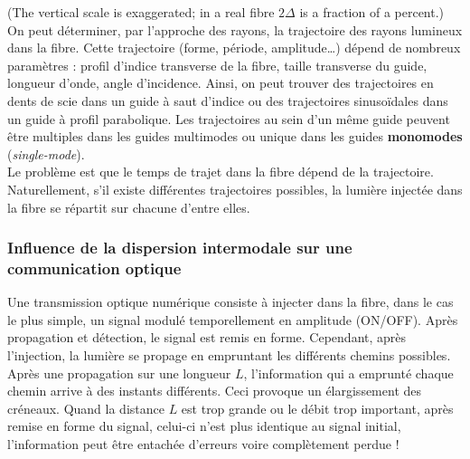 \begin{figure}[h!]
  \centering
\end{figure}

\noindent (The vertical scale is exaggerated; in a real fibre $2\Delta$ is a
fraction of a percent.) On peut déterminer, par l'approche des rayons, la
trajectoire des rayons lumineux dans la fibre. Cette trajectoire (forme,
période, amplitude…) dépend de nombreux paramètres : profil d'indice transverse
de la fibre, taille transverse du guide, longueur d'onde, angle d'incidence.
Ainsi, on peut trouver des trajectoires en dents de scie dans un guide à saut
d'indice ou des trajectoires sinusoïdales dans un guide à profil parabolique.
Les trajectoires au sein d'un même guide peuvent être multiples dans les guides
multimodes ou unique dans les guides \textbf{monomodes}
(\textit{single-mode}).\\

Le problème est que le temps de trajet dans la fibre dépend de la trajectoire.
Naturellement, s'il existe différentes trajectoires possibles, la lumière
injectée dans la fibre se répartit sur chacune d'entre elles.

\subsubsection{Influence de la dispersion intermodale sur une communication optique}
Une transmission optique numérique consiste à injecter dans la fibre, dans le
cas le plus simple, un signal modulé temporellement en amplitude (ON/OFF).
Après propagation et détection, le signal est remis en forme. Cependant, après
l'injection, la lumière se propage en empruntant les différents chemins
possibles. Après une propagation sur une longueur $L$, l'information qui a
emprunté chaque chemin arrive à des instants différents. Ceci provoque un
élargissement des créneaux. Quand la distance $L$ est trop grande ou le débit
trop important, après remise en forme du signal, celui-ci n'est plus identique
au signal initial, l'information peut être entachée d'erreurs voire
complètement perdue !

